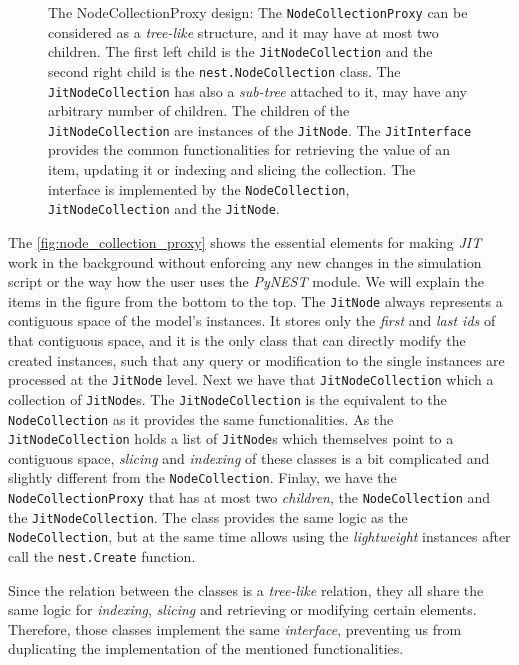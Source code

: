 \begin{figure}[ht!]
    \caption{The NodeCollectionProxy design: The \texttt{NodeCollectionProxy} can be considered as a \emph{tree-like} structure, and it may have at most two children. The first left child is the \texttt{JitNodeCollection} and the second right child is the \texttt{nest.NodeCollection} class. The \texttt{JitNodeCollection} has also a \emph{sub-tree} attached to it, may have any arbitrary number of children. The children of the \texttt{JitNodeCollection} are instances of the \texttt{JitNode}. The \texttt{JitInterface} provides the common functionalities for retrieving the value of an item, updating it or indexing and slicing the collection. The interface is implemented by the \texttt{NodeCollection}, \texttt{JitNodeCollection} and the \texttt{JitNode}.}
    \label{fig:node_collection_proxy}
\end{figure}

The \autoref{fig:node_collection_proxy} shows the essential elements for making \emph{JIT} work in the background without enforcing any new changes in the simulation script or the way how the user uses the \emph{PyNEST} module. We will explain the items in the figure from the bottom to the top. The \texttt{JitNode} always represents a contiguous space of the model's instances. It stores only the \emph{first} and \emph{last ids} of that contiguous space, and it is the only class that can directly modify the created instances, such that any query or modification to the single instances are processed at the \texttt{JitNode} level. Next we have that \texttt{JitNodeCollection} which a collection of \texttt{JitNode}s. The \texttt{JitNodeCollection} is the equivalent to the \texttt{NodeCollection} as it provides the same functionalities. As the \texttt{JitNodeCollection} holds a list of \texttt{JitNode}s which themselves point to a contiguous space, \emph{slicing} and \emph{indexing} of these classes is a bit complicated and slightly different from the \texttt{NodeCollection}. Finlay, we have the \texttt{NodeCollectionProxy} that has at most two \emph{children}, the \texttt{NodeCollection} and the \texttt{JitNodeCollection}. The class provides the same logic as the \texttt{NodeCollection}, but at the same time allows using the \emph{lightweight} instances after call the \texttt{nest.Create} function.

Since the relation between the classes is a  \emph{tree-like} relation, they all share the same logic for \emph{indexing}, \emph{slicing} and retrieving or modifying certain elements. Therefore, those classes implement the same \emph{interface}, preventing us from duplicating the implementation of the mentioned functionalities. 




